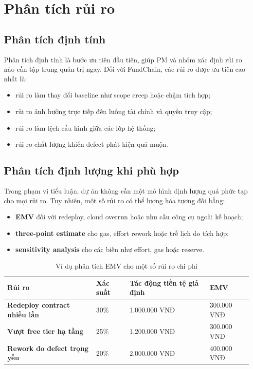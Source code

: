 
\section{Phân tích rủi ro}

\subsection{Phân tích định tính}

Phân tích định tính là bước ưu tiên đầu tiên, giúp PM và nhóm xác định rủi ro nào cần tập trung quản trị ngay. Đối với FundChain, các rủi ro được ưu tiên cao nhất là:

\begin{itemize}
  \item rủi ro làm thay đổi baseline như scope creep hoặc chậm tích hợp;
  \item rủi ro ảnh hưởng trực tiếp đến luồng tài chính và quyền truy cập;
  \item rủi ro làm lệch cấu hình giữa các lớp hệ thống;
  \item rủi ro chất lượng khiến defect phát hiện quá muộn.
\end{itemize}

\subsection{Phân tích định lượng khi phù hợp}

Trong phạm vi tiểu luận, dự án không cần một mô hình định lượng quá phức tạp cho mọi rủi ro. Tuy nhiên, một số rủi ro có thể lượng hóa tương đối bằng:

\begin{itemize}
  \item \textbf{EMV} đối với redeploy, cloud overrun hoặc nhu cầu công cụ ngoài kế hoạch;
  \item \textbf{three-point estimate} cho gas, effort rework hoặc trễ lịch do tích hợp;
  \item \textbf{sensitivity analysis} cho các biến như effort, gas hoặc reserve.
\end{itemize}

\begin{table}[H]
\centering
\caption{Ví dụ phân tích EMV cho một số rủi ro chi phí}
\label{tab:emv-sample}
\begin{tabularx}{\textwidth}{| >{\bfseries}p{3.8cm} | p{2.2cm} | p{3cm} | X |}
\hline
Rủi ro & Xác suất & Tác động tiền tệ giả định & EMV \\
\hline
Redeploy contract nhiều lần & 30\% & 1.000.000 VNĐ & 300.000 VNĐ \\ \hline
Vượt free tier hạ tầng & 25\% & 1.200.000 VNĐ & 300.000 VNĐ \\ \hline
Rework do defect trọng yếu & 20\% & 2.000.000 VNĐ & 400.000 VNĐ \\
\hline
\end{tabularx}
\end{table}


